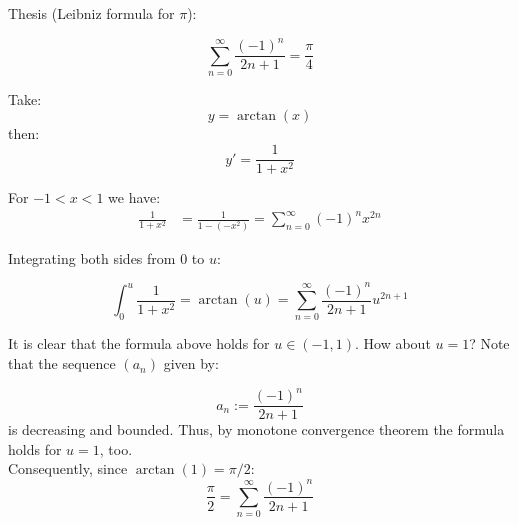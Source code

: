 \documentclass[12pt]{article}
\begin{document}
\noindent Thesis (Leibniz formula for $\pi$):

$$ \sum_{n=0}^{\infty} \frac{(-1)^n}{2n+1} = \frac{\pi}{4} $$

\noindent Take:
$$ y = \arctan(x) $$
then:
$$ y' = \frac{1}{1+x^2} $$

\noindent For $-1 < x < 1$ we have:
\begin{eqnarray*}
\frac{1}{1+x^2} &= \displaystyle\frac{1}{1 - (-x^2)} = \displaystyle\sum_{n=0}^{\infty} (-1)^n x^{2n}
\end{eqnarray*}

\noindent Integrating both sides from $0$ to $u$:

\begin{equation*}
\int_{0}^{u} \frac{1}{1+x^2} = \arctan(u) = \sum_{n=0}^{\infty} \frac{(-1)^n}{2n+1} u^{2n+1}
\end{equation*}

\noindent It is clear that the formula above holds for $u \in (-1, 1)$. How about $u=1$?
Note that the sequence $(a_n)$ given by:

$$
a_n := \frac{(-1)^n}{2n+1} 
$$
is decreasing and bounded. Thus, by monotone convergence theorem the formula holds for $u=1$, too.
\\ \noindent Consequently, since $\arctan(1) = \pi/2$:
$$
\frac{\pi}{2} = \sum_{n=0}^{\infty} \frac{(-1)^n}{2n + 1}
$$
\end{document}
